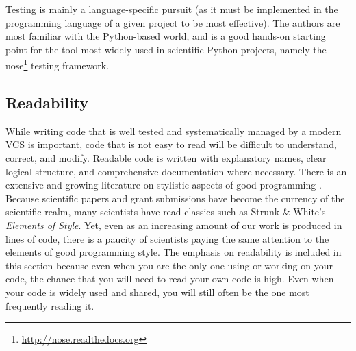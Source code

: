 \documentclass[11pt,oneside,english]{article}
\begin{document}
Testing is mainly a language-specific pursuit (as it must be implemented in the
programming language of a given project to be most effective).  The authors are
most familiar with the Python-based world, and \cite{ctb-nose:2006} is a good
hands-on starting point for the tool most widely used in scientific Python
projects, namely the nose\footnote{\url{http://nose.readthedocs.org}} testing
framework.


\subsection{\label{subsec:readability}Readability}

While writing code that is well tested and systematically managed by a modern
VCS is important, code that is not easy to read will be difficult to
understand, correct, and modify. Readable code is written with explanatory
names, clear logical structure, and comprehensive documentation where
necessary.  There is an extensive and growing literature on stylistic
aspects of good programming \cite{boswell2011art, Fow00, kernighan1999practice,
HT00, mcconnell2009code}. Because scientific papers and grant submissions have
become the currency of the scientific realm, many scientists have read classics
such as Strunk \& White's \emph{Elements of Style}. Yet, even as an increasing
amount of our work is produced in lines of code, there is a paucity of
scientists paying the same attention to the elements of good programming style.
The emphasis on readability is included in this section because even when you
are the only one using or working on your code, the chance that you will need
to read your own code is high. Even when your code is widely used and shared,
you will still often be the one most frequently reading it.
\end{document}
